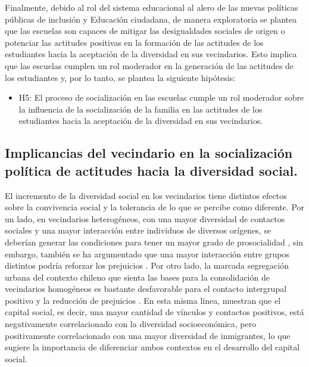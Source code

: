 \documentclass[12pt,twoside]{templates/facsothesis}
\providecommand{\tightlist}{%
  \setlength{\itemsep}{0pt}\setlength{\parskip}{0pt}}
\begin{document}
Finalmente, debido al rol del sistema educacional al alero de las nuevas políticas públicas de inclusión y Educación ciudadana, de manera exploratoria se plantea que las escuelas son capaces de mitigar las desigualdades sociales de origen o potenciar las actitudes positivas en la formación de las actitudes de los estudiantes hacia la aceptación de la diversidad en sus vecindarios. Esto implica que las escuelas cumplen un rol moderador en la generación de las actitudes de los estudiantes y, por lo tanto, se plantea la siguiente hipótesis:

\begin{itemize}
\tightlist
\item
  H5: El proceso de socialización en las escuelas cumple un rol moderador sobre la influencia de la socialización de la familia en las actitudes de los estudiantes hacia la aceptación de la diversidad en sus vecindarios.
\end{itemize}

\hypertarget{implicancias-del-vecindario-en-la-socializaciuxf3n-poluxedtica-de-actitudes-hacia-la-diversidad-social.}{%
\subsection{Implicancias del vecindario en la socialización política de actitudes hacia la diversidad social.}\label{implicancias-del-vecindario-en-la-socializaciuxf3n-poluxedtica-de-actitudes-hacia-la-diversidad-social.}}

El incremento de la diversidad social en los vecindarios tiene distintos efectos sobre la convivencia social y la tolerancia de lo que se percibe como diferente. Por un lado, en vecindarios heterogéneos, con una mayor diversidad de contactos sociales y una mayor interacción entre individuos de diversos orígenes, se deberían generar las condiciones para tener un mayor grado de prosocialidad \citep{diprete_segregation_2011}, sin embargo, también se ha argumentado que una mayor interacción entre grupos distintos podría reforzar los prejuicios \citep{putnam_pluribus_2007}. Por otro lado, la marcada segregación urbana del contexto chileno que sienta las bases para la consolidación de vecindarios homogéneos es bastante desfavorable para el contacto intergrupal positivo y la reducción de prejuicios \citep{garreton_city_2017}. En esta misma línea, \citet{garreton_social_2021} muestran que el capital social, es decir, una mayor cantidad de vínculos y contactos positivos, está negativamente correlacionado con la diversidad socioeconómica, pero positivamente correlacionado con una mayor diversidad de inmigrantes, lo que sugiere la importancia de diferenciar ambos contextos en el desarrollo del capital social.
\end{document}
